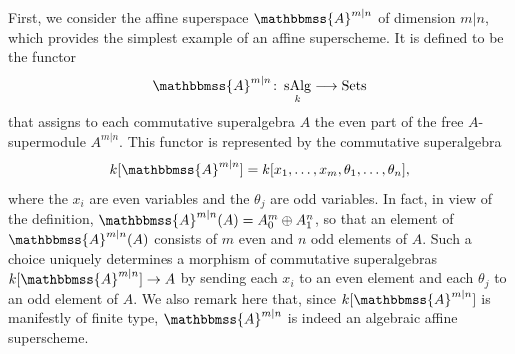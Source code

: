 \documentclass[11pt,a4paper,reqno,noamsfonts]{amsart}
\numberwithin{equation}{section}
\theoremstyle{definition}
\theoremstyle{remark}
\renewcommand{\AA}{\ensuremath{\mathbbmss{A}}}
\DeclareMathOperator{\Sets}{Sets}
\DeclareMathOperator{\sAlg}{sAlg}
\begin{document}
First, we consider the affine superspace $\AA^{m \vert n}$ of dimension $m \vert n$, which provides the simplest example of an affine superscheme. It is defined to be the functor
\begin{equation}
\AA^{m \vert n} \colon \sAlg_k \longrightarrow \Sets
\end{equation}
that assigns to each commutative superalgebra $A$ the even part of the free $A$-supermodule $A^{m \vert n}$. This functor is represented by the commutative superalgebra
\begin{equation}
k[\AA^{m \vert n}] = k[x_1, \dots, x_m, \theta_1, \dots, \theta_n],
\end{equation}
where the $x_i$ are even variables and the $\theta_j$ are odd variables. In fact, in view of the definition, $\AA^{m \vert n}(A) = A_0^m \oplus A_1^n$, so that an element of $\AA^{m \vert n}(A)$ consists of $m$ even and $n$ odd elements of $A$. Such a choice uniquely determines a morphism of commutative superalgebras  $k[\AA^{m \vert n}]  \to A$ by sending each $x_i$ to an even element and each $\theta_j$ to an odd element of $A$. We also remark here that, since $k[\AA^{m \vert n}]$ is manifestly of finite type, $\AA^{m \vert n}$ is indeed an algebraic affine superscheme.
\end{document}
